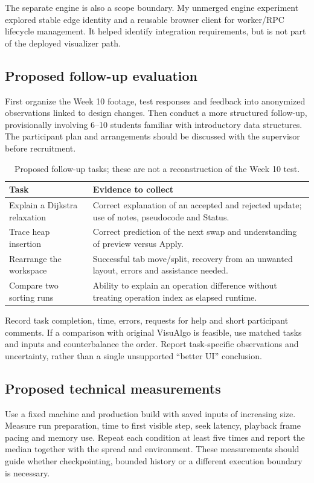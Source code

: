 \documentclass[11pt,a4paper]{article}
\begin{document}
The separate engine is also a scope boundary. My unmerged engine experiment explored stable edge identity and a reusable browser client for worker/RPC lifecycle management. It helped identify integration requirements, but is not part of the deployed visualizer path.

\subsection{Proposed follow-up evaluation}
First organize the Week 10 footage, test responses and feedback into anonymized observations linked to design changes. Then conduct a more structured follow-up, provisionally involving 6--10 students familiar with introductory data structures. The participant plan and arrangements should be discussed with the supervisor before recruitment.

\begin{table}[tbp]\small\centering
\caption{Proposed follow-up tasks; these are not a reconstruction of the Week 10 test.}
\begin{tabularx}{\linewidth}{@{}p{41mm}X@{}}\toprule
Task & Evidence to collect\\\midrule
Explain a Dijkstra relaxation & Correct explanation of an accepted and rejected update; use of notes, pseudocode and Status.\\
Trace heap insertion & Correct prediction of the next swap and understanding of preview versus Apply.\\
Rearrange the workspace & Successful tab move/split, recovery from an unwanted layout, errors and assistance needed.\\
Compare two sorting runs & Ability to explain an operation difference without treating operation index as elapsed runtime.\\\bottomrule
\end{tabularx}
\end{table}

Record task completion, time, errors, requests for help and short participant comments. If a comparison with original VisuAlgo is feasible, use matched tasks and inputs and counterbalance the order. Report task-specific observations and uncertainty, rather than a single unsupported ``better UI'' conclusion.

\subsection{Proposed technical measurements}
Use a fixed machine and production build with saved inputs of increasing size. Measure run preparation, time to first visible step, seek latency, playback frame pacing and memory use. Repeat each condition at least five times and report the median together with the spread and environment. These measurements should guide whether checkpointing, bounded history or a different execution boundary is necessary.
\end{document}
